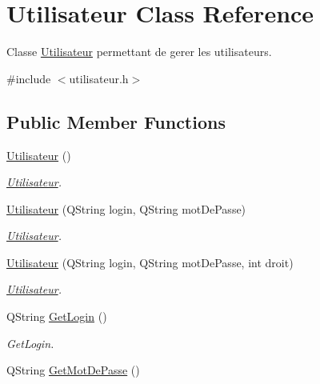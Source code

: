 \hypertarget{class_utilisateur}{}\section{Utilisateur Class Reference}
\label{class_utilisateur}


Classe \mbox{\hyperlink{class_utilisateur}{Utilisateur}} permettant de gerer les utilisateurs.  




{\ttfamily \#include $<$utilisateur.\+h$>$}

\subsection*{Public Member Functions}
\begin{DoxyCompactItemize}
\item 
\mbox{\label{class_utilisateur_ae76433a6d353c5f5ad0c6a6af64022ad}} 
\mbox{\hyperlink{class_utilisateur_ae76433a6d353c5f5ad0c6a6af64022ad}{Utilisateur}} ()
\begin{DoxyCompactList}\small\item\em \mbox{\hyperlink{class_utilisateur}{Utilisateur}}. \end{DoxyCompactList}\item 
\mbox{\hyperlink{class_utilisateur_a9c279c4e14b76e43412e1480f3cfa07e}{Utilisateur}} (Q\+String login, Q\+String mot\+De\+Passe)
\begin{DoxyCompactList}\small\item\em \mbox{\hyperlink{class_utilisateur}{Utilisateur}}. \end{DoxyCompactList}\item 
\mbox{\hyperlink{class_utilisateur_a14ac7e9bd12689670dc386393f86045f}{Utilisateur}} (Q\+String login, Q\+String mot\+De\+Passe, int droit)
\begin{DoxyCompactList}\small\item\em \mbox{\hyperlink{class_utilisateur}{Utilisateur}}. \end{DoxyCompactList}\item 
Q\+String \mbox{\hyperlink{class_utilisateur_a3b830246e73edd798e0945e3b9904b93}{Get\+Login}} ()
\begin{DoxyCompactList}\small\item\em Get\+Login. \end{DoxyCompactList}\item 
Q\+String \mbox{\hyperlink{class_utilisateur_ad558f2e85090c4660e97e6de6f8d1567}{Get\+Mot\+De\+Passe}} ()

\end{DoxyCompactItemize}
